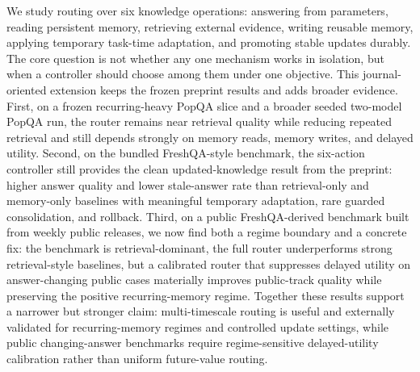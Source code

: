 We study routing over six knowledge operations: answering from parameters, reading persistent memory, retrieving external evidence, writing reusable memory, applying temporary task-time adaptation, and promoting stable updates durably. The core question is not whether any one mechanism works in isolation, but when a controller should choose among them under one objective. This journal-oriented extension keeps the frozen preprint results and adds broader evidence. First, on a frozen recurring-heavy PopQA slice and a broader seeded two-model PopQA run, the router remains near retrieval quality while reducing repeated retrieval and still depends strongly on memory reads, memory writes, and delayed utility. Second, on the bundled FreshQA-style benchmark, the six-action controller still provides the clean updated-knowledge result from the preprint: higher answer quality and lower stale-answer rate than retrieval-only and memory-only baselines with meaningful temporary adaptation, rare guarded consolidation, and rollback. Third, on a public FreshQA-derived benchmark built from weekly public releases, we now find both a regime boundary and a concrete fix: the benchmark is retrieval-dominant, the full router underperforms strong retrieval-style baselines, but a calibrated router that suppresses delayed utility on answer-changing public cases materially improves public-track quality while preserving the positive recurring-memory regime. Together these results support a narrower but stronger claim: multi-timescale routing is useful and externally validated for recurring-memory regimes and controlled update settings, while public changing-answer benchmarks require regime-sensitive delayed-utility calibration rather than uniform future-value routing.
